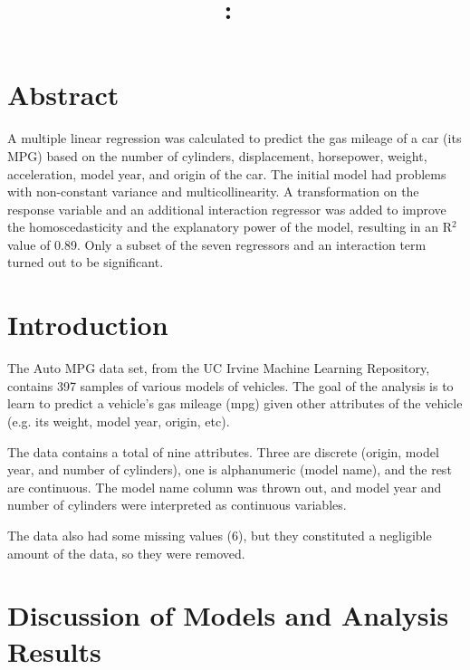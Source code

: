 \documentclass{article}
\title{
    \vspace{2in}
    \textmd{\textbf{\hmwkClass:\ \hmwkTitle}}\\
    \normalsize\vspace{0.1in}\small\vspace{0.1in}\large{\textit{\hmwkClassInstructor}}
    \vspace{3in}
}
\author{\hmwkAuthorName}
\date{}
\newcommand{\mt}[1]{\ensuremath{#1}}
\newcommand{\uf}[2]{#1\mt{^{#2}}}
\begin{document}
\maketitle

\newpage

\tableofcontents

\listoftables

\listoffigures

\newpage

\section{Abstract}

  A multiple linear regression was calculated to predict the gas mileage of a car (its MPG) based on the number of cylinders, displacement, horsepower, weight, acceleration, model year, and origin of the car. The initial model had problems with non-constant variance and multicollinearity. A transformation on the response variable and an additional interaction regressor was added to improve the homoscedasticity and the explanatory power of the model, resulting in an \uf{R}{2} value of 0.89. Only a subset of the seven regressors and an interaction term turned out to be significant.

\newpage

\section{Introduction}

  The Auto MPG data set, from the UC Irvine Machine Learning Repository, contains 397 samples of various models of vehicles. The goal of the analysis is to learn to predict a vehicle's gas mileage (mpg) given other attributes of the vehicle (e.g. its weight, model year, origin, etc).
  
  The data contains a total of nine attributes. Three are discrete (origin, model year, and number of cylinders), one is alphanumeric (model name), and the rest are continuous. The model name column was thrown out, and model year and number of cylinders were interpreted as continuous variables.
  
  The data also had some missing values (6), but they constituted a negligible amount of the data, so they were removed.
  
\newpage

\section{Discussion of Models and Analysis Results}
\end{document}

